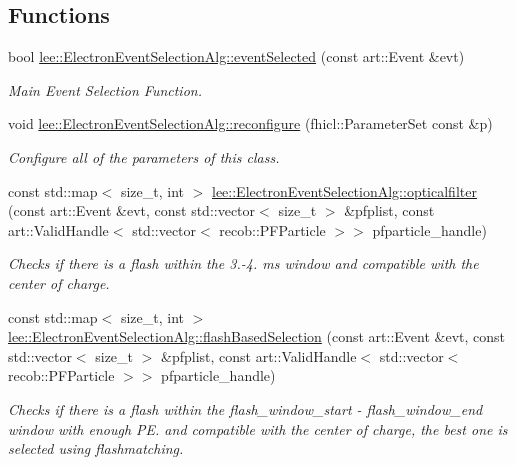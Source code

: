 \subsection*{Functions}
\begin{DoxyCompactItemize}
\item 
bool \hyperlink{group__lee_ga59666f2bec60817a81fcdd467d9b9641}{lee\-::\-Electron\-Event\-Selection\-Alg\-::event\-Selected} (const art\-::\-Event \&evt)
\begin{DoxyCompactList}\small\item\em Main Event Selection Function. \end{DoxyCompactList}\item 
void \hyperlink{group__lee_ga8f1378ec08aba381d438816c8bc31951}{lee\-::\-Electron\-Event\-Selection\-Alg\-::reconfigure} (fhicl\-::\-Parameter\-Set const \&p)
\begin{DoxyCompactList}\small\item\em Configure all of the parameters of this class. \end{DoxyCompactList}\item 
const std\-::map$<$ size\-\_\-t, int $>$ \hyperlink{group__lee_ga1853e2053d74627cd4466cf670dc0c31}{lee\-::\-Electron\-Event\-Selection\-Alg\-::opticalfilter} (const art\-::\-Event \&evt, const std\-::vector$<$ size\-\_\-t $>$ \&pfplist, const art\-::\-Valid\-Handle$<$ std\-::vector$<$ recob\-::\-P\-F\-Particle $>$$>$ pfparticle\-\_\-handle)
\begin{DoxyCompactList}\small\item\em Checks if there is a flash within the 3.-\/4. ms window and compatible with the center of charge. \end{DoxyCompactList}\item 
const std\-::map$<$ size\-\_\-t, int $>$ \hyperlink{group__lee_ga4d8d979b26116ec25d26884702d0f9c6}{lee\-::\-Electron\-Event\-Selection\-Alg\-::flash\-Based\-Selection} (const art\-::\-Event \&evt, const std\-::vector$<$ size\-\_\-t $>$ \&pfplist, const art\-::\-Valid\-Handle$<$ std\-::vector$<$ recob\-::\-P\-F\-Particle $>$$>$ pfparticle\-\_\-handle)
\begin{DoxyCompactList}\small\item\em Checks if there is a flash within the flash\-\_\-window\-\_\-start -\/ flash\-\_\-window\-\_\-end window with enough P\-E. and compatible with the center of charge, the best one is selected using flashmatching. \end{DoxyCompactList}\item 

\end{DoxyCompactItemize}
